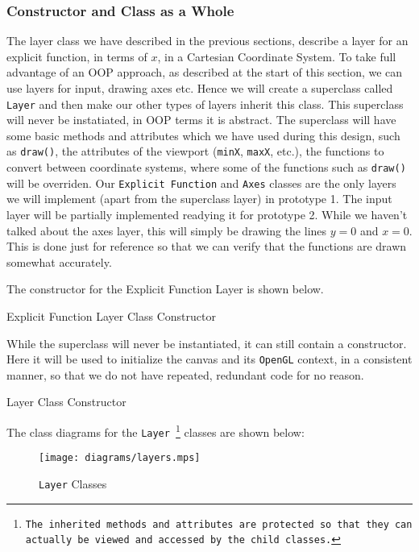 \documentclass[../../../../../../main.tex]{subfiles}
\begin{document}
\subsubsection{Constructor and Class as a Whole}
The layer class we have described in the previous sections, describe a layer for an explicit function, in terms of $x$, in a Cartesian Coordinate System. To take full advantage of an OOP approach, as described at the start of this section, we can use layers for input, drawing axes etc. Hence we will create a superclass called \texttt{Layer} and then make our other types of layers inherit this class. This superclass will never be instatiated, in OOP terms it is abstract. The superclass will have some basic methods and attributes which we have used during this design, such as \texttt{draw()}, the attributes of the viewport (\texttt{minX}, \texttt{maxX}, etc.), the functions to convert between coordinate systems, where some of the functions such as \texttt{draw()} will be overriden. Our \texttt{Explicit Function} and \texttt{Axes} classes are the only layers we will implement (apart from the superclass layer) in prototype 1. The input layer will be partially implemented readying it for prototype 2. While we haven't talked about the axes layer, this will simply be drawing the lines $y=0$ and $x=0$. This is done just for reference so that we can verify that the functions are drawn somewhat accurately.

The constructor for the Explicit Function Layer is shown below.

\begin{algorithm}[H]
\DontPrintSemicolon
\caption{Explicit Function Layer Class Constructor}
\end{algorithm}

While the superclass will never be instantiated, it can still contain a constructor. Here it will be used to initialize the canvas and its \texttt{OpenGL} context, in a consistent manner, so that we do not have repeated, redundant code for no reason.

\begin{algorithm}[H]
\DontPrintSemicolon
\caption{Layer Class Constructor}
\end{algorithm}

The class diagrams for the \texttt{Layer
\footnote{The inherited methods and attributes are protected so that they can actually be viewed and accessed by the child classes.}}
 classes are shown below:
\begin{figure}[H]
	\centering
	\texttt{[image: diagrams/layers.mps]}
	\caption{\texttt{Layer} Classes}
\end{figure}
\newpage
\end{document}
